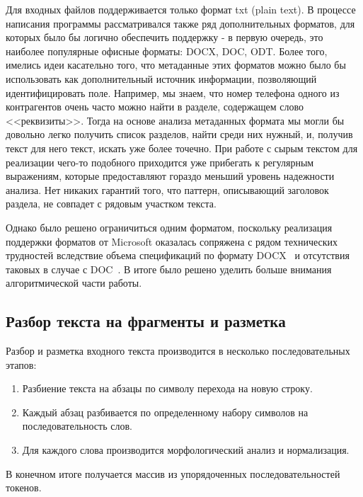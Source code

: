Для входных файлов поддерживается только формат txt (plain text). В процессе написания программы рассматривался также ряд дополнительных форматов, для которых было бы логично обеспечить поддержку - в первую очередь, это наиболее популярные офисные форматы: DOCX, DOC, ODT. Более того, имелись идеи касательно того, что метаданные этих форматов можно было бы использовать как дополнительный источник информации, позволяющий идентифицировать поле. Например, мы знаем, что номер телефона одного из контрагентов очень часто можно найти в разделе, содержащем слово <<реквизиты>>. Тогда на основе анализа метаданных формата мы могли бы довольно легко получить список разделов, найти среди них нужный, и, получив текст для него текст, искать уже более точечно. При работе с сырым текстом для реализации чего-то подобного приходится уже прибегать к регулярным выражениям, которые предоставляют гораздо меньший уровень надежности анализа. Нет никаких гарантий того, что паттерн, описывающий заголовок раздела, не совпадет с рядовым участком текста.

Однако было решено ограничиться одним форматом, поскольку реализация поддержки форматов от Microsoft оказалась сопряжена с рядом технических трудностей вследствие объема спецификаций по формату DOCX~\autocite{Open-Office-XML} и отсутствия таковых в случае с DOC~\autocite{DOC-Format}. В итоге было решено уделить больше внимания алгоритмической части работы.

\subsection{Разбор текста на фрагменты и разметка}
Разбор и разметка входного текста производится в несколько последовательных этапов:
\begin{enumerate}
  \item Разбиение текста на абзацы по символу перехода на новую строку.
  \item Каждый абзац разбивается по определенному набору символов на последовательность слов.
  \item Для каждого слова производится морфологический анализ и нормализация.
\end{enumerate}
В конечном итоге получается массив из упорядоченных последовательностей токенов.

